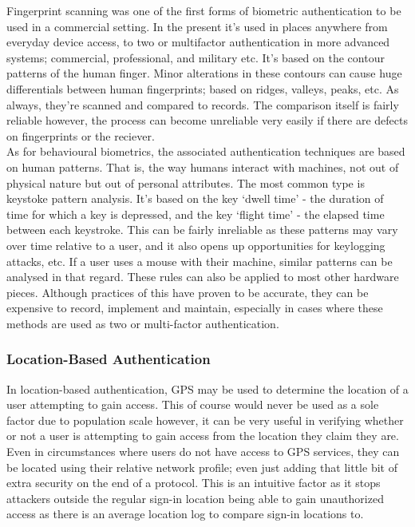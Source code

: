 \documentclass[11pt, english]{article}
\begin{document}
	Fingerprint scanning was one of the first forms of biometric authentication to be used in a commercial setting. In the present it's used in places anywhere from everyday device access, to two or multifactor authentication in more advanced systems; commercial, professional, and military etc. It's based on the contour patterns of the human finger. Minor alterations in these contours can cause huge differentials between human fingerprints; based on ridges, valleys, peaks, etc. As always, they're scanned and compared to records. The comparison itself is fairly reliable however, the process can become unreliable very easily if there are defects on fingerprints or the reciever.\\

	As for behavioural biometrics, the associated authentication techniques are based on human patterns. That is, the way humans interact with machines, not out of physical nature but out of personal attributes. The most common type is keystoke pattern analysis. It's based on the key `dwell time' - the duration of time for which a key is depressed, and the key `flight time' - the elapsed time between each keystroke. This can be fairly inreliable as these patterns may vary over time relative to a user, and it also opens up opportunities for keylogging attacks, etc. If a user uses a mouse with their machine, similar patterns can be analysed in that regard. These rules can also be applied to most other hardware pieces. Although practices of this have proven to be accurate, they can be expensive to record, implement and maintain, especially in cases where these methods are used as two or multi-factor authentication.

		\subsubsection{Location-Based Authentication}

	In location-based authentication, GPS may be used to determine the location of a user attempting to gain access. This of course would never be used as a sole factor due to population scale however, it can be very useful in verifying whether or not a user is attempting to gain access from the location they claim they are. Even in circumstances where users do not have access to GPS services, they can be located using their relative network profile; even just adding that little bit of extra security on the end of a protocol. This is an intuitive factor as it stops attackers outside the regular sign-in location being able to gain unauthorized access as there is an average location log to compare sign-in locations to.
			
\end{document}
